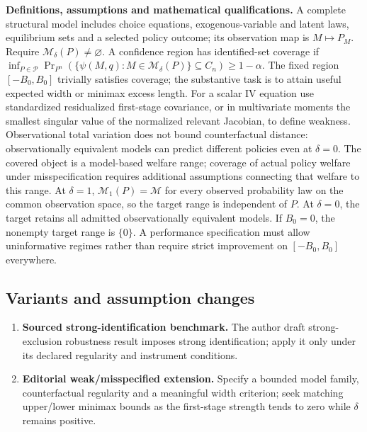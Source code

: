 \documentclass[11pt,a4paper]{article}
\begin{document}
\textbf{Definitions, assumptions and mathematical qualifications.} A complete structural model includes choice equations, exogenous-variable and latent laws, equilibrium sets and a selected policy outcome; its observation map is \(M\mapsto P_M\). Require \(\mathcal M_\delta(P)\ne\varnothing\). A confidence region has identified-set coverage if \(\inf_{P\in\mathcal P}\Pr_{P^n}(\{\psi(M,q):M\in\mathcal M_\delta(P)\}\subseteq C_n)\geq1-\alpha\). The fixed region \([-B_0,B_0]\) trivially satisfies coverage; the substantive task is to attain useful expected width or minimax excess length. For a scalar IV equation use standardized residualized first-stage covariance, or in multivariate moments the smallest singular value of the normalized relevant Jacobian, to define weakness. Observational total variation does not bound counterfactual distance: observationally equivalent models can predict different policies even at \(\delta=0\). The covered object is a model-based welfare range; coverage of actual policy welfare under misspecification requires additional assumptions connecting that welfare to this range. At \(\delta=1\), \(\mathcal M_1(P)=\mathcal M\) for every observed probability law on the common observation space, so the target range is independent of \(P\). At \(\delta=0\), the target retains all admitted observationally equivalent models. If \(B_0=0\), the nonempty target range is \(\{0\}\). A performance specification must allow uninformative regimes rather than require strict improvement on \([-B_0,B_0]\) everywhere.
\subsection*{Variants and assumption changes}
\begin{enumerate}
\item \textbf{Sourced strong-identification benchmark.} The author draft strong-exclusion robustness result imposes strong identification; apply it only under its declared regularity and instrument conditions.
\item \textbf{Editorial weak/misspecified extension.} Specify a bounded model family, counterfactual regularity and a meaningful width criterion; seek matching upper/lower minimax bounds as the first-stage strength tends to zero while \(\delta\) remains positive.
\end{enumerate}
\end{document}
